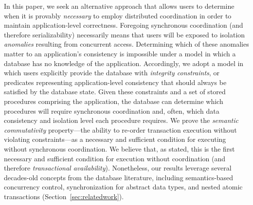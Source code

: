 In this paper, we seek an alternative approach that allows users to
determine when it is provably \textit{necessary} to employ distributed
coordination in order to maintain application-level
correctness. Foregoing synchronous coordination (and therefore
serializability) necessarily means that users will be exposed to
isolation \textit{anomalies} resulting from concurrent
access. Determining which of these anomalies matter to an
application's consistency is impossible under a model in which a
database has no knowledge of the application. Accordingly, we adopt a
model in which users explicitly provide the database with
\textit{integrity constraints}, or predicates representing
application-level consistency that should always be satisfied by the
database state. Given these constraints and a set of stored procedures
comprising the application, the database can determine which
procedures will require synchronous coordination and, often, which
data consistency and isolation level each procedure requires. We prove
the \textit{semantic commutativity} property---the ability to re-order
transaction execution without violating constraints---as a necessary
and sufficient condition for executing without synchronous
coordination. We believe that, as stated, this is the first necessary
and sufficient condition for execution without coordination (and
therefore \textit{transactional availability}). Nonetheless, our
results leverage several decades-old concepts from the database
literature, including semantics-based concurrency control,
synchronization for abstract data types, and nested atomic
transactions (Section~\ref{sec:relatedwork}).

